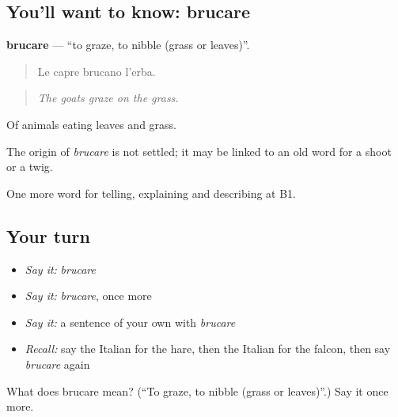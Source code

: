\subsection*{You'll want to know: brucare}
\textbf{brucare} — \textquotedblleft{}to graze, to nibble (grass or leaves)\textquotedblright{}.

\begin{quote}
Le capre brucano l'erba.
\end{quote}

\begin{quote}
\emph{The goats graze on the grass.}
\end{quote}

Of animals eating leaves and grass.

\begin{cousinweb}
The origin of \emph{brucare} is not settled; it may be linked to an old word for a shoot or a twig.
\end{cousinweb}

\begin{grammarlens}[title={What you've built}]
One more word for telling, explaining and describing at B1.
\end{grammarlens}

\subsection*{Your turn}
\begin{itemize}
\raggedright
  \item \emph{Say it:} \emph{brucare}
  \item \emph{Say it:} \emph{brucare}, once more
  \item \emph{Say it:} a sentence of your own with \emph{brucare}
  \item \emph{Recall:} say the Italian for the hare, then the Italian for the falcon, then say \emph{brucare} again
\end{itemize}

\begin{tcolorbox}[breakable,colback=teal!4,colframe=teal!35!black,title={Before you move on}]
What does brucare mean? (\textquotedblleft{}To graze, to nibble (grass or leaves)\textquotedblright{}.) Say it once more.
\end{tcolorbox}
